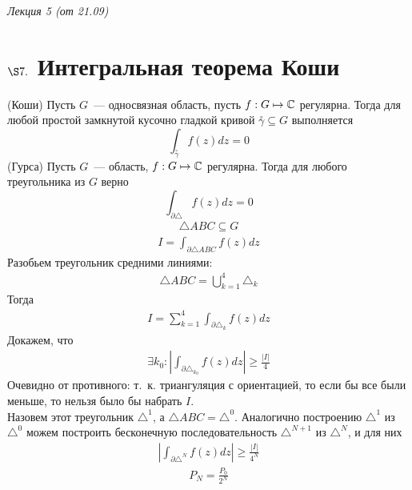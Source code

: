 \begin{flushright}
    \textit{Лекция 5 (от 21.09)}
\end{flushright}
\section{$\S 7.$ Интегральная теорема Коши}
\theorem (Коши)
Пусть $G$~--- односвязная область, пусть $f: G \mapsto \mathbb{C}$
регулярна. Тогда для любой простой замкнутой кусочно гладкой кривой
$\overset{\circ}{\gamma} \subseteq G$ выполняется
\begin{equation} \label{(7.1)}
  \int_{\overset{\circ}{\gamma}}f(z)dz = 0
\end{equation}
\lemma (Гурса)
Пусть $G$~--- область, $f: G \mapsto \mathbb{C}$ регулярна. Тогда для
любого треугольника из $G$ верно
\begin{equation} \label{(7.2)}
  \int_{\partial \triangle} f(z) dz = 0
\end{equation}
\pr
\begin{align*}
  \triangle ABC \subseteq G
\end{align*}
\begin{align*}
  I = \int_{\partial \triangle ABC}f(z)dz
\end{align*}
Разобьем треугольник средними линиями:
\begin{align*}
  \triangle ABC = \bigcup_{k=1}^{4}\triangle_k
\end{align*}
Тогда
\begin{align*}
  I = \sum_{k=1}^4\int_{\partial \triangle_k}f(z)dz
\end{align*}
Докажем, что
\begin{align*}
  \exists k_0: \left| \int_{\partial \triangle_{k_0}} f(z)dz\right|\geq\frac{\left| I \right|}{4}
\end{align*}
Очевидно от противного: т.~к. триангуляция с ориентацией, то если бы все были
меньше, то нельзя было бы набрать $I$.
\\
Назовем этот треугольник $\triangle^1$, а $\triangle ABC = \triangle^0$.
Аналогично построению $\triangle^1$ из $\triangle^0$ можем построить
бесконечную последовательность $\triangle^{N+1}$ из $\triangle^N$, и для них
\begin{align*}
  \left| \int_{\partial \triangle^N} f(z)dz\right|\geq\frac{\left| I \right|}{4^N}
\end{align*}
\begin{align*}
  P_N = \frac{P_0}{2^N}
\end{align*}
